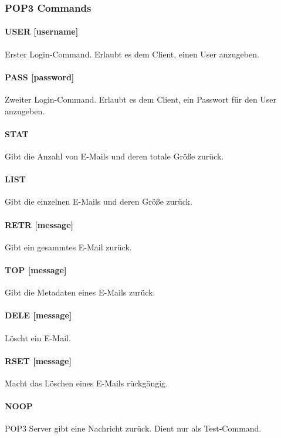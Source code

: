 \documentclass[12pt, letterpaper]{article}
\begin{document}
\subsubsection{POP3 Commands}

\paragraph{USER [username]}
Erster Login-Command. Erlaubt es dem Client, einen User anzugeben.

\paragraph{PASS [password]}
Zweiter Login-Command. Erlaubt es dem Client, ein Passwort für den User anzugeben.

\paragraph{STAT}
Gibt die Anzahl von E-Mails und deren totale Größe zurück.

\paragraph{LIST}
Gibt die einzelnen E-Mails und deren Größe zurück.

\paragraph{RETR [message]}
Gibt ein gesammtes E-Mail zurück.

\paragraph{TOP [message]}
Gibt die Metadaten eines E-Mails zurück.

\paragraph{DELE [message]}
Löscht ein E-Mail.

\paragraph{RSET [message]}
Macht das Löschen eines E-Mails rückgängig.

\paragraph{NOOP}
POP3 Server gibt eine Nachricht zurück. Dient nur als Test-Command.
\end{document}
